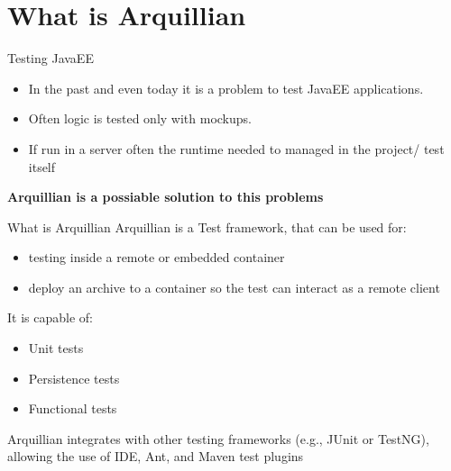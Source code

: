 \section[Introduction]{What is Arquillian}
\begin{frame}{Testing JavaEE}
\begin{itemize}
\item In the past and even today it is a problem to test JavaEE applications. 
\item Often logic is tested only with mockups.
\item If run in a server often the runtime needed to managed in the project/ test itself
\end{itemize}
\begin{center}
	{\textbf{Arquillian is a possiable solution to this problems}}
\end{center}
\end{frame}

\begin{frame}{What is Arquillian}
	Arquillian is a Test framework, that can be used for:
	 \begin{itemize}
	 	\item testing inside a remote or embedded container
	 	\item deploy an archive to a container so the test can interact as a remote client
	 \end{itemize}
	 
	 It is capable of:
	 \begin{itemize}
	 	\item Unit tests
	 	\item Persistence tests
	 	\item Functional tests
	 \end{itemize}
	 
	 Arquillian integrates with other testing frameworks (e.g., JUnit or TestNG), allowing the use of IDE, Ant, and Maven test plugins
\end{frame}


